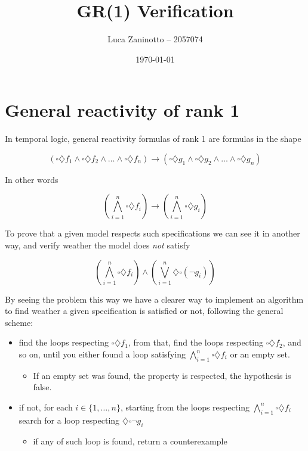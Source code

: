 \documentclass[10pt]{article}
\author{Luca Zaninotto -- 2057074}
\date{\today}
\title{GR(1) Verification}
\begin{document}
\maketitle
\section*{General reactivity of rank 1}
\label{sec:org42701e0}
In temporal logic, general reactivity formulas of rank 1 are
formulas in the shape

\[(\square\diamondsuit f_1 \wedge \square\diamondsuit f_2 \wedge \dots \wedge
  \square\diamondsuit f_n) \rightarrow (\square\diamondsuit g_1 \wedge
  \square\diamondsuit g_2 \wedge \dots \wedge \square\diamondsuit g_n)\]

In other words

\[\left(\bigwedge_{i=1}^n\square\diamondsuit f_i\right) \rightarrow
  \left(\bigwedge_{i=1}^n \square \diamondsuit g_i\right)\]

To prove that a given model respects such specifications we can see
it in another way, and verify weather the model does \emph{not} satisfy

\[\left(\bigwedge_{i=1}^n\square\diamondsuit f_i\right) \wedge
  \left(\bigvee_{i=1}^n\diamondsuit\square (\neg g_i)\right)\]

By seeing the problem this way we have a clearer way to implement an
algorithm to find weather a given specification is satisfied or not,
following the general scheme:
\begin{itemize}
\item find the loops respecting \(\square\diamondsuit f_1\), from that, find
the loops respecting \(\square\diamondsuit f_2\), and so on, until you
either found a loop satisfying \(\bigwedge_{i=1}^n\square\diamondsuit
    f_i\) or an empty set.
\begin{itemize}
\item If an empty set was found, the property is respected, the
hypothesis is false.
\end{itemize}
\item if not, for each \(i \in \{1,\dots,n\}\), starting from the loops
respecting \(\bigwedge_{i=1}^n\square\diamondsuit f_i\) search for
a loop respecting \(\diamondsuit\square \neg g_i\)
\begin{itemize}
\item if any of such loop is found, return a counterexample
\end{itemize}
\end{itemize}
\end{document}
